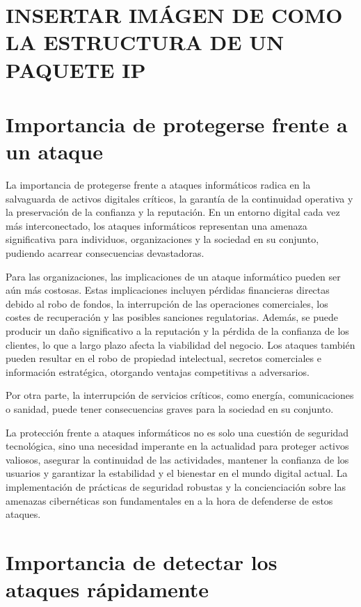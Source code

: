 \section{INSERTAR IMÁGEN DE COMO LA ESTRUCTURA DE UN PAQUETE IP}

\section{Importancia de protegerse frente a un ataque}

La importancia de protegerse frente a ataques informáticos radica en la salvaguarda de activos digitales críticos, la garantía de la continuidad operativa y la preservación de la confianza y la reputación. En un entorno digital cada vez más interconectado, los ataques informáticos representan una amenaza significativa para individuos, organizaciones y la sociedad en su conjunto, pudiendo acarrear consecuencias devastadoras.

Para las organizaciones, las implicaciones de un ataque informático pueden ser aún más costosas. Estas implicaciones incluyen pérdidas financieras directas debido al robo de fondos, la interrupción de las operaciones comerciales, los costes de recuperación y las posibles sanciones regulatorias. Además, se puede producir un daño significativo a la reputación y la pérdida de la confianza de los clientes, lo que a largo plazo afecta la viabilidad del negocio. Los ataques también pueden resultar en el robo de propiedad intelectual, secretos comerciales e información estratégica, otorgando ventajas competitivas a adversarios. 

Por otra parte, la interrupción de servicios críticos, como energía, comunicaciones o sanidad, puede tener consecuencias graves para la sociedad en su conjunto.

La protección frente a ataques informáticos no es solo una cuestión de seguridad tecnológica, sino una necesidad imperante en la actualidad para proteger activos valiosos, asegurar la continuidad de las actividades, mantener la confianza de los usuarios y garantizar la estabilidad y el bienestar en el mundo digital actual. La implementación de prácticas de seguridad robustas y la concienciación sobre las amenazas cibernéticas son fundamentales en a la hora de defenderse de estos ataques.


\section{Importancia de detectar los ataques rápidamente}

